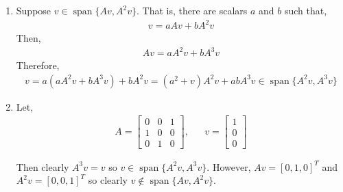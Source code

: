 \documentclass[10pt]{article}
\begin{document}
\begin{solution}[Solution]
\begin{enumerate}[label=(\alph*)]
    \item Suppose \( v\in\operatorname{span}\{Av,A^2v\} \). That is, there are scalars \( a \) and \( b \) such that,
        \begin{align*}
            v = aAv+bA^2v
        \end{align*}
        Then,
        \begin{align*}
            Av = aA^2v + bA^3v
        \end{align*}
        Therefore,
        \begin{align*}
            v = a(aA^2v+bA^3v)+bA^2v = (a^2+v)A^2v+abA^3v \in\operatorname{span}\{A^2v,A^3v\} \tag*{\qed}
        \end{align*}
        
    \item 
        Let,
        \begin{align*}
            A = \left[\begin{array}{ccc}
            0 & 0 & 1 \\
            1 & 0 & 0 \\
            0 & 1 & 0
            \end{array}\right]
            ,&&
            v = \left[\begin{array}{c}1 \\ 0 \\ 0\end{array}\right]
        \end{align*}
        
        Then clearly \( A^3v = v \) so \( v\in\operatorname{span}\{A^2v,A^3v\} \). However, \( Av = [0,1,0]^T \) and \( A^2v = [0,0,1]^T \) so clearly \( v\notin\operatorname{span}\{Av,A^2v\} \).



\end{enumerate}
  
\end{solution}
\end{document}
